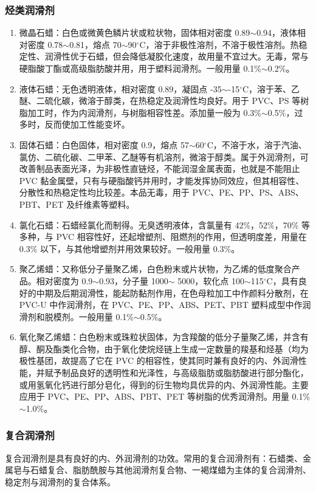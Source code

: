\documentclass[a4paper, oneside, onecolumn, 12pt]{ctexrep}    %
\newcommand{\cd}{$^{\circ}$C}  %
\begin{document}
\subsubsection{烃类润滑剂}
\begin{enumerate}
    \item[\ding{192}] 微晶石蜡：白色或微黄色鳞片状或粒状物，固体相对密度 0.89$\sim$0.94，液体相对密度 0.78$\sim$0.81，熔点 70$\sim$90\cd，溶于非极性溶剂，不溶于极性溶剂。热稳定性、润滑性优于石蜡，但会降低凝胶化速度，故用量不宜过大。无毒，常与硬脂酸丁酯或高级脂肪酸并用，用于塑料润滑剂。一般用量 0.1\%$\sim$0.2\%。
    \item[\ding{193}] 液体石蜡：无色透明液体，相对密度 0.89，凝固点 -35$\sim$-15\cd，溶于苯、乙醚、二硫化碳，微溶于醇类，在热稳定及润滑性均良好。用于 PVC、PS 等树脂加工时，作为内润滑剂，与树脂相容性差。添加量一般为 0.3\%$\sim$0.5\%，过多时，反而使加工性能变坏。
    \item[\ding{194}] 固体石蜡：白色固体，相对密度 0.9，熔点 57$\sim$60\cd，不溶于水，溶于汽油、氯仿、二硫化碳、二甲苯、乙醚等有机溶剂，微溶于醇类。属于外润滑剂，可改善制品表面光泽，为非极性直链烃，不能润湿金属表面，也就是不能阻止 PVC 黏金属壁，只有与硬脂酸钙并用时，才能发挥协同效应，但其相容性、分散性和热稳定性均比较差。本品无毒，用于 PVC、PE、PP、PS、ABS、PBT、PET 及纤维素等塑料。
    \item[\ding{195}] 氯化石蜡：石蜡经氯化而制得。无臭透明液体，含氯量有 42\%，52\%，70\% 等多种，与 PVC 相容性好，还起增塑剂、阻燃剂的作用，但透明度差，用量在 0.3\% 以下，与其他增塑剂并用效果较好。一般用量 0.3\%。
    \item[\ding{196}] 聚乙烯蜡：又称低分子量聚乙烯，白色粉末或片状物，为乙烯的低度聚合产品。相对密度为 0.9$\sim$0.93，分子量 1000$\sim$ 5000，软化点 100$\sim$115\cd，具有良好的中期及后期润滑性，能起防黏剂作用，在色母粒加工中作颜料分散剂，在 PVC-U 中作润滑剂，在 PVC、PE、PP、ABS、PET、PBT 塑料成型中作润滑剂和脱模剂。一般用量 0.1\%$\sim$0.5\%。
    \item[\ding{197}] 氧化聚乙烯蜡：白色粉末或珠粒状固体，为含羧酸的低分子量聚乙烯，并含有醇、酮及酯类化合物，由于氧化使烷烃链上生成一定数量的羧基和烃基（均为极性基团，故提高了它在 PVC 的相容性，使其同时兼有良好的内、外润滑性能，并赋予制品良好的透明性和光泽性，与高级脂肪或脂肪酸进行部分酯化，或用氢氧化钙进行部分皂化，得到的衍生物均具优异的内、外润滑性能。主要应用于 PVC、PE、PP、ABS、PBT、PET 等树脂的优秀润滑剂。用量 0.1\%$\sim$1.0\%。
\end{enumerate}

\subsubsection{复合润滑剂}
复合润滑剂是具有良好的内、外润滑剂的功效。常用的复合润滑剂有：石蜡类、金属皂与石蜡复合、脂肪酰胺与其他润滑剂复合物、一褐煤蜡为主体的复合润滑剂、稳定剂与润滑剂的复合体系。
\end{document}
